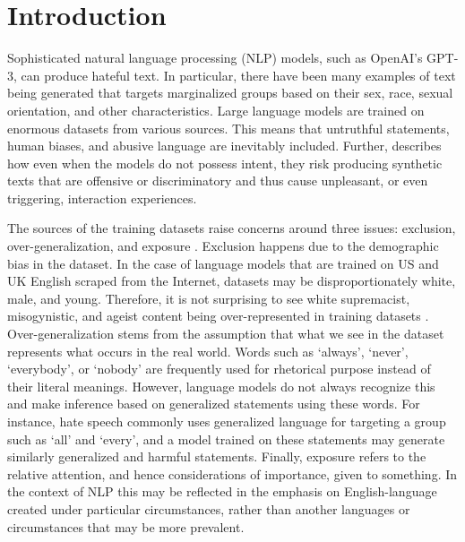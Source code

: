 \documentclass[12pt,]{article}
\begin{document}
\vskip -8.5pt



\noindent  

\hypertarget{introduction}{%
\section{Introduction}\label{introduction}}

Sophisticated natural language processing (NLP) models, such as OpenAI's GPT-3, can produce hateful text. In particular, there have been many examples of text being generated that targets marginalized groups based on their sex, race, sexual orientation, and other characteristics. Large language models are trained on enormous datasets from various sources. This means that untruthful statements, human biases, and abusive language are inevitably included. Further, \citet{bender2021dangers} describes how even when the models do not possess intent, they risk producing synthetic texts that are offensive or discriminatory and thus cause unpleasant, or even triggering, interaction experiences.

The sources of the training datasets raise concerns around three issues: exclusion, over-generalization, and exposure \citep{hovy2016social}. Exclusion happens due to the demographic bias in the dataset. In the case of language models that are trained on US and UK English scraped from the Internet, datasets may be disproportionately white, male, and young. Therefore, it is not surprising to see white supremacist, misogynistic, and ageist content being over-represented in training datasets \citep{bender2021dangers}. Over-generalization stems from the assumption that what we see in the dataset represents what occurs in the real world. Words such as `always', `never', `everybody', or `nobody' are frequently used for rhetorical purpose instead of their literal meanings. However, language models do not always recognize this and make inference based on generalized statements using these words. For instance, hate speech commonly uses generalized language for targeting a group such as `all' and `every', and a model trained on these statements may generate similarly generalized and harmful statements. Finally, exposure refers to the relative attention, and hence considerations of importance, given to something. In the context of NLP this may be reflected in the emphasis on English-language created under particular circumstances, rather than another languages or circumstances that may be more prevalent.
\end{document}
